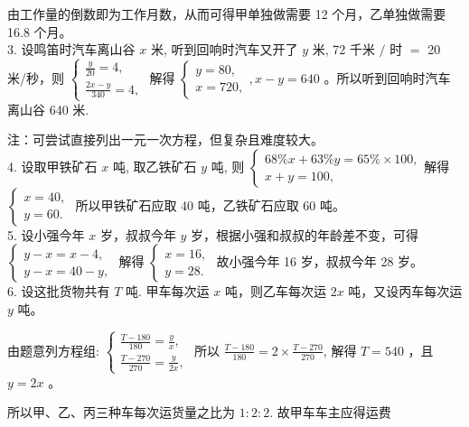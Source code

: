 \documentclass[10pt]{article}
\begin{document}
由工作量的倒数即为工作月数，从而可得甲单独做需要 12 个月，乙单独做需要 16.8 个月。\\
3. 设鸣笛时汽车离山谷 $x$ 米, 听到回响时汽车又开了 $y$ 米, 72 千米 $/$ 时 $=$ 20 米/秒，则 $\left\{\begin{array}{l}\frac{y}{20}=4, \\ \frac{2 x-y}{340}=4,\end{array}\right.$ 解得 $\left\{\begin{array}{l}y=80, \\ x=720,\end{array}, x-y=640\right.$ 。所以听到回响时汽车离山谷 640 米.

注：可尝试直接列出一元一次方程，但复杂且难度较大。\\
4. 设取甲铁矿石 $x$ 吨, 取乙铁矿石 $y$ 吨, 则 $\left\{\begin{array}{l}68 \% x+63 \% y=65 \% \times 100, \\ x+y=100,\end{array}\right.$解得 $\left\{\begin{array}{l}x=40, \\ y=60 .\end{array}\right.$ 所以甲铁矿石应取 40 吨，乙铁矿石应取 60 吨。\\
5. 设小强今年 $x$ 岁，叔叔今年 $y$ 岁，根据小强和叔叔的年龄差不变，可得 $\left\{\begin{array}{l}y-x=x-4, \\ y-x=40-y,\end{array}\right.$ 解得 $\left\{\begin{array}{l}x=16, \\ y=28 .\end{array}\right.$ 故小强今年 16 岁，叔叔今年 28 岁。\\
6. 设这批货物共有 $T$ 吨. 甲车每次运 $x$ 吨，则乙车每次运 $2 x$ 吨，又设丙车每次运 $y$ 吨。

由题意列方程组: $\left\{\begin{array}{l}\frac{T-180}{180}=\frac{y}{x}, \\ \frac{T-270}{270}=\frac{y}{2 x},\end{array}\right.$ 所以 $\frac{T-180}{180}=2 \times \frac{T-270}{270}$, 解得 $T=540$ ，且 $y=2 x$ 。

所以甲、乙、丙三种车每次运货量之比为 $1: 2: 2$. 故甲车车主应得运费
\end{document}
